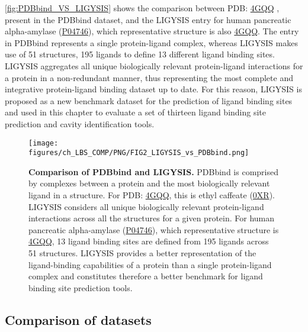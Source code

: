 \autoref{fig:PDBbind_VS_LIGYSIS} shows the comparison between PDB: \href{https://www.ebi.ac.uk/pdbe/entry/pdb/4GQQ}{4GQQ} \cite{WILLIAMS_2012_AMYLASE}, present in the PDBbind dataset, and the LIGYSIS entry for human pancreatic alpha-amylase (\href{https://www.uniprot.org/uniprotkb/P04746/entry}{P04746}), which representative structure is also \href{https://www.ebi.ac.uk/pdbe/entry/pdb/4GQQ}{4GQQ}. The entry in PDBbind represents a single protein-ligand complex, whereas LIGYSIS makes use of 51 structures, 195 ligands to define 13 different ligand binding sites. LIGYSIS aggregates all unique biologically relevant protein-ligand interactions for a protein in a non-redundant manner, thus representing the most complete and integrative protein-ligand binding dataset up to date. For this reason, LIGYSIS is proposed as a new benchmark dataset for the prediction of ligand binding sites and used in this chapter to evaluate a set of thirteen ligand binding site prediction and cavity identification tools.

\begin{figure}[htb!]
    \centering
    \texttt{[image: figures/ch\_LBS\_COMP/PNG/FIG2\_LIGYSIS\_vs\_PDBbind.png]}
    \caption[Comparison of PDBbind and LIGYSIS]{\textbf{Comparison of PDBbind and LIGYSIS.} PDBbind is comprised by complexes between a protein and the most biologically relevant ligand in a structure. For PDB: \href{https://www.ebi.ac.uk/pdbe/entry/pdb/4GQQ}{4GQQ}, this is ethyl caffeate (\href{https://www.ebi.ac.uk/pdbe-srv/pdbechem/chemicalCompound/show/0XR}{0XR}). LIGYSIS considers all unique biologically relevant protein-ligand interactions across all the structures for a given protein. For human pancreatic alpha-amylase (\href{https://www.uniprot.org/uniprotkb/P04746/entry}{P04746}), which representative structure is \href{https://www.ebi.ac.uk/pdbe/entry/pdb/4GQQ}{4GQQ}, 13 ligand binding sites are defined from 195 ligands across 51 structures. LIGYSIS provides a better representation of the ligand-binding capabilities of a protein than a single protein-ligand complex and constitutes therefore a better benchmark for ligand binding site prediction tools.}
    \label{fig:PDBbind_VS_LIGYSIS}
\end{figure}

\subsection{Comparison of datasets}

